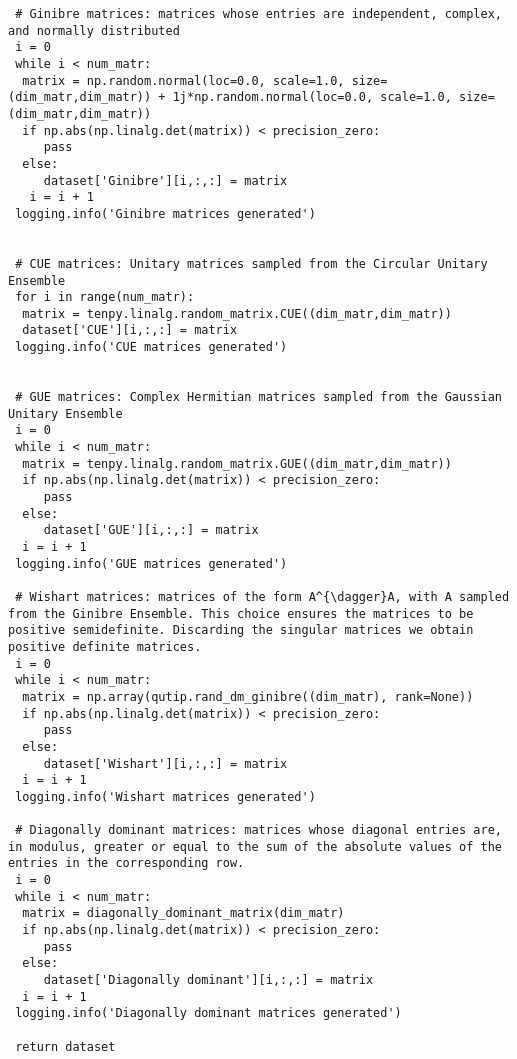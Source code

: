 \documentclass[a4paper,11pt]{report}
\begin{document}
\begin{verbatim}
 # Ginibre matrices: matrices whose entries are independent, complex, and normally distributed
 i = 0
 while i < num_matr:  
  matrix = np.random.normal(loc=0.0, scale=1.0, size=(dim_matr,dim_matr)) + 1j*np.random.normal(loc=0.0, scale=1.0, size=(dim_matr,dim_matr))
  if np.abs(np.linalg.det(matrix)) < precision_zero:
     pass
  else:
     dataset['Ginibre'][i,:,:] = matrix
   i = i + 1
 logging.info('Ginibre matrices generated')


 # CUE matrices: Unitary matrices sampled from the Circular Unitary Ensemble
 for i in range(num_matr):  
  matrix = tenpy.linalg.random_matrix.CUE((dim_matr,dim_matr))
  dataset['CUE'][i,:,:] = matrix
 logging.info('CUE matrices generated')


 # GUE matrices: Complex Hermitian matrices sampled from the Gaussian Unitary Ensemble
 i = 0
 while i < num_matr:  
  matrix = tenpy.linalg.random_matrix.GUE((dim_matr,dim_matr))
  if np.abs(np.linalg.det(matrix)) < precision_zero:
     pass
  else:
     dataset['GUE'][i,:,:] = matrix
  i = i + 1
 logging.info('GUE matrices generated')

 # Wishart matrices: matrices of the form A^{\dagger}A, with A sampled from the Ginibre Ensemble. This choice ensures the matrices to be positive semidefinite. Discarding the singular matrices we obtain positive definite matrices.
 i = 0
 while i < num_matr:  
  matrix = np.array(qutip.rand_dm_ginibre((dim_matr), rank=None))
  if np.abs(np.linalg.det(matrix)) < precision_zero:
     pass
  else:
     dataset['Wishart'][i,:,:] = matrix
  i = i + 1
 logging.info('Wishart matrices generated')

 # Diagonally dominant matrices: matrices whose diagonal entries are, in modulus, greater or equal to the sum of the absolute values of the entries in the corresponding row.
 i = 0
 while i < num_matr:  
  matrix = diagonally_dominant_matrix(dim_matr)
  if np.abs(np.linalg.det(matrix)) < precision_zero:
     pass
  else:
     dataset['Diagonally dominant'][i,:,:] = matrix
  i = i + 1
 logging.info('Diagonally dominant matrices generated')

 return dataset
\end{verbatim}
\end{document}
